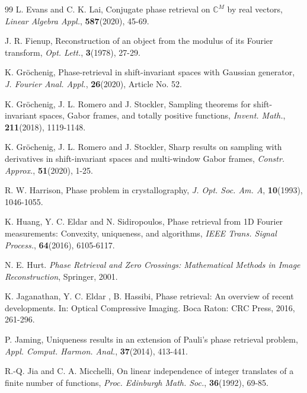 \documentclass[11pt,oneside,reqno]{amsart}
\numberwithin{equation}{section}
\def\C{ {\mathbb C} }
\begin{document}
\begin{thebibliography}{99}
L. Evans and C. K. Lai, Conjugate phase retrieval on $\C^M$ by real vectors, {\em Linear Algebra Appl.}, {\bf 587}(2020), 45-69.


 J. R. Fienup, Reconstruction of an object from the modulus of its Fourier transform, {\em Opt. Lett.}, {\bf 3}(1978), 27-29.



 K. Gr\"ochenig,
Phase-retrieval in shift-invariant spaces with Gaussian generator, {\em J.  Fourier Anal. Appl.}, {\bf 26}(2020), Article No. 52.

 K. Gr\"ochenig, J. L. Romero and J. Stockler,
Sampling theorems for shift-invariant spaces, Gabor frames, and totally positive functions, {\em Invent. Math.}, {\bf 211}(2018), 1119-1148.

 K. Gr\"ochenig, J. L. Romero and J. Stockler, Sharp results on sampling with derivatives
in shift-invariant spaces and multi-window Gabor frames, {\em Constr. Approx.}, {\bf 51}(2020), 1-25.


	R. W. Harrison, Phase problem in crystallography, \emph{J. Opt. Soc. Am. A}, {\bf 10}(1993), 1046-1055.




	
 K. Huang, Y. C. Eldar and N. Sidiropoulos, Phase retrieval from 1D Fourier measurements: Convexity, uniqueness, and algorithms, {\em IEEE Trans. Signal Process.}, {\bf 64}(2016), 6105-6117.



N. E. Hurt. {\em Phase Retrieval and Zero Crossings: Mathematical Methods in Image Reconstruction}, Springer, 2001.

 K. Jaganathan, Y. C. Eldar , B. Hassibi, Phase retrieval: An overview of recent developments. In: Optical Compressive
Imaging. Boca Raton: CRC Press, 2016, 261-296.

 P. Jaming, Uniqueness results in an extension of Pauli's phase retrieval problem, {\em Appl. Comput. Harmon. Anal.}, {\bf 37}(2014), 413-441.

   R.-Q. Jia and C. A. Micchelli, On linear independence of integer translates of
a finite number of functions, {\em Proc. Edinburgh Math. Soc.}, {\bf 36}(1992), 69-85. 


\end{thebibliography}
\end{document}
